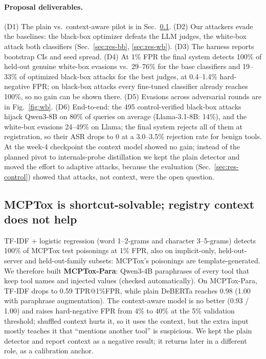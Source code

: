 \documentclass{article}
\begin{document}
\paragraph{Proposal deliverables.} (D1) The plain vs.\ context-aware pilot is in Sec.~\ref{sec:res-shortcut}.
(D2) Our attackers evade the baselines: the black-box optimizer defeats the LLM judges, the white-box attack both
classifiers (Sec.~\ref{sec:res-bb}, \ref{sec:res-wb}). (D3) The harness reports bootstrap CIs and seed spread.
(D4) At 1\% FPR the final system detects 100\% of held-out genuine white-box evasions vs.\ 29--76\% for the base
classifiers and 19--33\% of optimized black-box attacks for the best judges, at 0.4--1.4\% hard-negative FPR; on
black-box attacks every fine-tuned classifier already reaches 100\%, so no gain can be shown there. (D5) Evasions
across adversarial rounds are in Fig.~\ref{fig:wb}. (D6) End-to-end: the 495 control-verified black-box attacks
hijack Qwen3-8B on 80\% of queries on average (Llama-3.1-8B: 14\%), and the white-box evasions 24--49\% on Llama;
the final system rejects all of them at registration, so their ASR drops to 0 at a 3.0--3.5\% rejection rate for
benign tools. At the week-4 checkpoint the context model showed no gain; instead of the planned pivot to
internals-probe distillation we kept the plain detector and moved the effort to adaptive attacks, because the
evaluation (Sec.~\ref{sec:res-control}) showed that attacks, not context, were the open question.

\subsection{MCPTox is shortcut-solvable; registry context does not help}
\label{sec:res-shortcut}
TF-IDF + logistic regression (word 1--2-grams and character 3--5-grams) detects 100\% of MCPTox test poisonings at 1\%
FPR, also on implicit-only, held-out-server and held-out-family subsets: MCPTox's poisonings are template-generated.
We therefore built \textbf{MCPTox-Para}: Qwen3-4B paraphrases of every tool that keep tool names and injected values
(checked automatically). On MCPTox-Para, TF-IDF drops to 0.59 TPR@1\%FPR, while plain DeBERTa reaches 0.98 (1.00 with
paraphrase augmentation). The context-aware model is no better (0.93 / 1.00) and raises hard-negative FPR from 4\% to
40\% at the 5\% validation threshold; shuffled context hurts it, so it uses the context, but the extra input mostly
teaches it that ``mentions another tool'' is suspicious. We kept the plain detector and report context as a negative
result; it returns later in a different role, as a calibration anchor.
\end{document}
